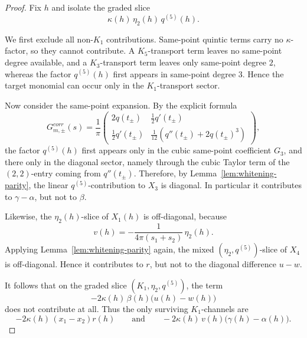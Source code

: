 \documentclass[11pt,a4paper]{amsart}
\def\corr{corr}%
\theoremstyle{plain}
\theoremstyle{definition}
\newcommand{\corr}{\mathrm{corr}}
\begin{document}
\begin{proof}
Fix $h$ and isolate the graded slice
\[
\kappa(h)\,\eta_2(h)\,q^{(5)}(h).
\]

We first exclude all non-$K_1$ contributions. Same-point quintic terms
carry no $\kappa$-factor, so they cannot contribute. A $K_5$-transport
term leaves no same-point degree available, and a $K_3$-transport term
leaves only same-point degree $2$, whereas the factor $q^{(5)}(h)$
first appears in same-point degree $3$. Hence the target monomial can
occur only in the $K_1$-transport sector.

Now consider the same-point expansion. By the explicit formula
\[
G_{m,\pm}^{\corr}(s)
=
\frac1\pi
\begin{pmatrix}
2q(t_\pm) & \frac12 q'(t_\pm)\\[.5ex]
\frac12 q'(t_\pm) & \frac1{12}(q''(t_\pm)+2q(t_\pm)^3)
\end{pmatrix},
\]
the factor $q^{(5)}(h)$ first appears only in the cubic same-point
coefficient $G_3$, and there only in the diagonal sector, namely through
the cubic Taylor term of the $(2,2)$-entry coming from $q''(t_\pm)$.
Therefore, by Lemma~\ref{lem:whitening-parity}, the linear
$q^{(5)}$-contribution to $X_3$ is diagonal. In particular it contributes
to $\gamma-\alpha$, but not to $\beta$.

Likewise, the $\eta_2(h)$-slice of $X_1(h)$ is off-diagonal, because
\[
v(h)=-\frac{1}{4\pi(s_1+s_2)}\,\eta_2(h).
\]
Applying Lemma~\ref{lem:whitening-parity} again, the mixed
$(\eta_2,q^{(5)})$-slice of $X_4$ is off-diagonal. Hence it contributes
to $r$, but not to the diagonal difference $u-w$.

It follows that on the graded slice
$(K_1,\eta_2,q^{(5)})$, the term
\[
-2\kappa(h)\,\beta(h)\bigl(u(h)-w(h)\bigr)
\]
does not contribute at all. Thus the only surviving $K_1$-channels are
\[
-2\kappa(h)\,(x_1-x_2)r(h)
\qquad\text{and}\qquad
-2\kappa(h)\,v(h)\bigl(\gamma(h)-\alpha(h)\bigr).
\]


\end{proof}
\end{document}

